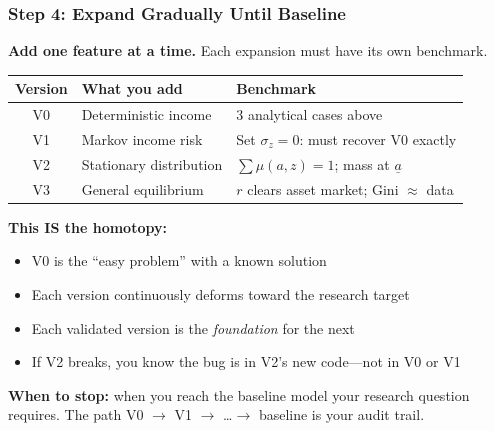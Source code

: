 \documentclass[10pt,english,aspectratio=169]{beamer}
\begin{document}
\begin{frame}
\frametitle{Step 4: Expand Gradually Until Baseline}

\textbf{Add one feature at a time.} Each expansion must have its own benchmark.

\vspace{0.3cm}

\begin{center}
\small
\begin{tabular}{|c|l|l|}
\hline
\textbf{Version} & \textbf{What you add} & \textbf{Benchmark} \\ \hline
V0 & Deterministic income & 3 analytical cases above \\ \hline
V1 & Markov income risk & Set $\sigma_z = 0$: must recover V0 exactly \\ \hline
V2 & Stationary distribution & $\sum \mu(a,z) = 1$; mass at $\underline{a}$ \\ \hline
V3 & General equilibrium & $r$ clears asset market; Gini $\approx$ data \\ \hline
\end{tabular}
\end{center}

\vspace{0.3cm}

\textbf{This IS the homotopy:}
\begin{itemize}
    \item V0 is the ``easy problem'' with a known solution
    \item Each version continuously deforms toward the research target
    \item Each validated version is the \textit{foundation} for the next
    \item If V2 breaks, you know the bug is in V2's new code---not in V0 or V1
\end{itemize}

\vspace{0.2cm}

\textbf{When to stop:} when you reach the baseline model your research question requires. The path V0 $\to$ V1 $\to$ \ldots $\to$ baseline is your audit trail.
\end{frame}
\end{document}
